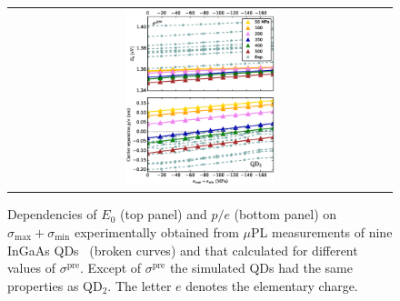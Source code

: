 \documentclass[aps,prl,amsmath,amssymb,twocolumn,showpacs,showkeys,superscriptaddress]{revtex4-1}
\begin{document}
\begin{figure}[!ht]
\renewcommand{\tabcolsep}{2pt}
\begin{center}
\begin{tabular}{c}
%
\includegraphics[width=0.4\textwidth]{FINAL__171219_8x8_neotocena_++_nn+_35deg_pres500___prestress.eps} \\
\end{tabular}
\end{center}
\caption{
Dependencies of $E_0$ (top panel) and $p/e$ (bottom panel) on $\sigma_{\mathrm{max}}+\sigma_{\mathrm{min}}$ experimentally obtained from $\mu$PL measurements of nine InGaAs QDs~\cite{Aberl:17} (broken curves) and that calculated for different values of $\sigma^{\mathrm{pre}}$. Except of $\sigma^{\mathrm{pre}}$ the simulated QDs had the same properties as QD$_2$. The letter $e$ denotes the elementary charge.
\label{fig:TuningByPrestress}}
\end{figure}
%
%
\end{document}
